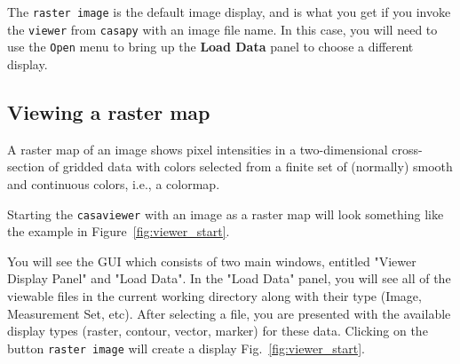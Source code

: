 The {\tt raster image} is the default image display, and is what you
get if you invoke the {\tt viewer} from {\tt casapy} with an image
file name.  In this case, you will need to use the {\tt Open} menu to
bring up the {\bf Load Data} panel to choose a different display.
%


\subsection{Viewing a raster map}
\label{section:display.image.raster}

A raster map of an image shows pixel intensities in a two-dimensional
cross-section of gridded data with colors selected from a finite set
of (normally) smooth and continuous colors, i.e., a colormap.


Starting the {\tt casaviewer} with an image as a raster map will look
something like the example in Figure~\ref{fig:viewer_start}. 
 
You will see the GUI which consists of two main windows, entitled
"Viewer Display Panel" and "Load Data". In the "Load Data" panel, you
will see all of the viewable files in the current working directory along
with their type (Image, Measurement Set, etc).  After selecting a file, you
are presented with the available display types (raster, contour,
vector, marker) for these data. Clicking
on the button {\tt raster image} will create a display
Fig.~\ref{fig:viewer_start}. 

